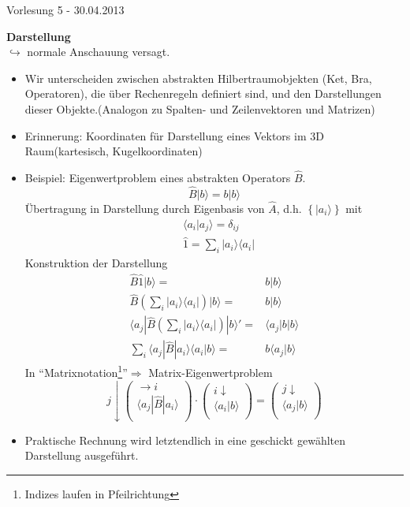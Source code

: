 \documentclass[10pt,article,colorback,accentcolor=tud9d]{scrartcl}
\begin{document}
\begin{flushright}
Vorlesung 5 - 30.04.2013
\end{flushright}
\textbf{Darstellung}\\
$\hookrightarrow$ normale Anschauung versagt.
\begin{itemize}
	\item Wir unterscheiden zwischen abstrakten Hilbertraumobjekten (Ket, Bra, Operatoren), die über Rechenregeln definiert sind, und den Darstellungen dieser Objekte.(Analogon zu Spalten- und Zeilenvektoren und Matrizen)
  \item Erinnerung: Koordinaten für Darstellung eines Vektors im 3D Raum(kartesisch, Kugelkoordinaten)
  \item Beispiel: Eigenwertproblem eines abstrakten Operators $\hat{B}$.
    \begin{equation}
    \hat{B}|b\rangle =b|b\rangle
    \end{equation}
    Übertragung in Darstellung durch Eigenbasis von $\hat{A}$, d.h. $\left\{|a_i\rangle\right\}$ mit
    \begin{equation}
    \begin{aligned}
    &\langle a_i|a_j\rangle=\delta_{ij}\\
    &\hat{1}=\sum_i|a_i\rangle\langle a_i|
    \end{aligned}
    \end{equation}
    Konstruktion der Darstellung
    \begin{equation}
    \begin{aligned}
      \hat{B}\hat{1}|b\rangle=&b|b\rangle\\
      \hat{B}\left(\sum_i|a_i\rangle\langle a_i|\right)|b\rangle=&b|b\rangle\\
      \langle a_j|\hat{B}\left(\sum_i|a_i\rangle\langle a_i|\right)|b\rangle'=&\langle a_j|b|b\rangle\\
      \sum_i\langle a_j|\hat{B}|a_i\rangle\langle a_i|b\rangle =&b\langle a_j|b\rangle      
    \end{aligned}
    \end{equation}
  In "`Matrixnotation\footnote{Indizes laufen in Pfeilrichtung}"'$\Rightarrow$ Matrix-Eigenwertproblem 
  \begin{equation}
    j \downarrow \left(\begin{array}{c} \rightarrow i \\ \langle a_j|\hat{B}|a_i\rangle \\ \left.\right.\end{array}\right)\cdot 
    \left(\begin{array}{c} i \downarrow \\ \langle a_i|b\rangle \\ \left.\right.\end{array}\right)=
    \left(\begin{array}{c} j \downarrow \\ \langle a_j|b\rangle \\ \left.\right.\end{array}\right)
  \end{equation}
\item Praktische Rechnung wird letztendlich in eine geschickt gewählten Darstellung ausgeführt.
\end{itemize}
\end{document}
